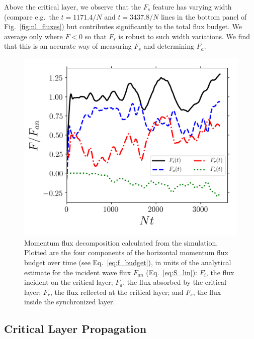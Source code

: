 \documentclass[
        fleqn,
        usenatbib,
    ]{mnras}
\begin{document}
Above the critical layer, we observe that the $F_s$ feature has varying width
(compare e.g.\ the $t = 1171.4/N$ and $t = 3437.8/N$ lines in the bottom panel
of Fig.~\ref{fig:nl_fluxes}) but contributes significantly to the total
flux budget. We average only where $F < 0$ so that $F_s$ is robust to such width
variations. We find that this is an accurate way of measuring $F_s$ and
determining $F_a$.

\begin{figure}
    \centering
    \includegraphics[width=0.9\columnwidth]{plots/nl_f_amps2.png}
    \caption{Momentum flux decomposition calculated from the simulation. Plotted
    are the four components of the horizontal momentum flux budget over time
    (see Eq.~\eqref{eq:f_budget}), in units of the analytical estimate for the
    incident wave flux $F_{an}$ (Eq.~\eqref{eq:S_lin}): $F_i$, the flux incident
    on the critical layer; $F_a$, the flux absorbed by the critical layer;
    $F_r$, the flux reflected at the critical layer; and $F_s$, the flux inside
    the synchronized layer.}\label{fig:nl_f_amps2}
\end{figure}

\subsection{Critical Layer Propagation}\label{ss:cl_prop}
\end{document}
